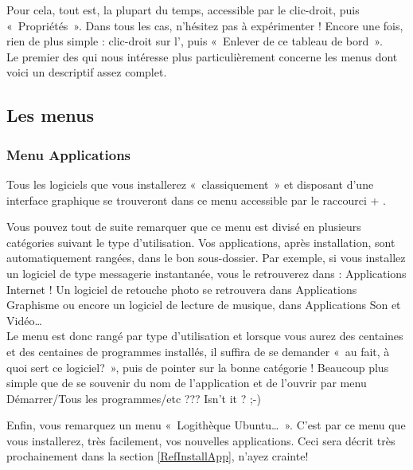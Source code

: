 Pour cela, tout est, la plupart du temps, accessible par le clic-droit, puis «~Propriétés~». Dans tous les cas, n'hésitez pas à expérimenter !
Encore une fois, rien de plus simple : clic-droit sur l', puis «~Enlever de ce tableau de bord~».\\
Le premier des  qui nous intéresse plus particulièrement concerne les menus dont voici un  descriptif assez complet.
\subsection{Les menus}
\label{RefMenuGNOME}
\subsubsection{Menu Applications}
Tous les logiciels que vous installerez «~classiquement~» et disposant d'une interface graphique se trouveront dans ce menu accessible par le raccourci  + .\par
Vous pouvez tout de suite remarquer que ce menu est divisé en plusieurs catégories suivant le type d'utilisation. Vos applications, après installation, sont automatiquement rangées, dans le bon sous-dossier. Par exemple, si vous installez un logiciel de type messagerie instantanée, vous le retrouverez dans : Applications \FlecheDroite Internet ! Un logiciel de retouche photo  se retrouvera dans Applications \FlecheDroite Graphisme ou encore un logiciel de lecture de musique, dans Applications \FlecheDroite Son et Vidéo\ldots{}\\
Le menu est donc rangé par type d'utilisation et lorsque vous aurez des centaines et des centaines de programmes installés, il suffira de se demander «~au fait, à quoi sert ce logiciel?~», puis de pointer sur la bonne catégorie ! Beaucoup plus simple que de se souvenir du nom de l'application et de l'ouvrir par menu Démarrer/Tous les programmes/etc ??? Isn't it ? ;-)\par
Enfin, vous remarquez un menu «~Logithèque Ubuntu\dots{}~». C'est par ce menu que vous installerez, très facilement, vos nouvelles applications. Ceci sera décrit très prochainement dans la section \ref{RefInstallApp}, n'ayez crainte!\\
